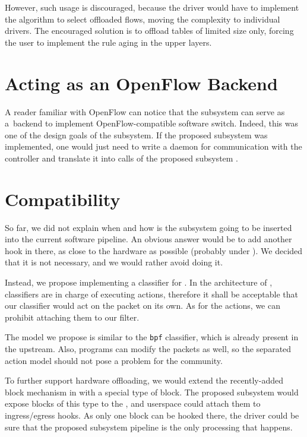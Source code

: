 However, such usage is discouraged, because the driver would have to
implement the algorithm to select offloaded flows, moving the complexity to
individual drivers. The encouraged solution is to offload tables of limited
size only, forcing the user to implement the rule aging in the upper layers.

\section{Acting as an OpenFlow Backend}

A reader familiar with OpenFlow can notice that the subsystem can serve as
a~backend to implement OpenFlow-compatible software switch. Indeed, this was
one of the design goals of the subsystem. If the proposed subsystem was
implemented, one would just need to write a daemon for communication with the
 controller and translate it into calls of the proposed subsystem
.

\section{Compatibility}
\label{rfc:tc}

So far, we did not explain when and how is the subsystem going to be inserted
into the current software pipeline. An obvious answer would be to add another
hook in there, as close to the hardware as possible (probably under ). We
decided that it is not necessary, and we would rather avoid doing it.

Instead, we propose implementing a classifier for . In the architecture
of , classifiers are in charge of executing actions, therefore it shall
be acceptable that our classifier would act on the packet on its own. As for
the  actions, we can prohibit attaching them to our filter.

The model we propose is similar to the \texttt{bpf}  classifier, which is already present
in the upstream. Also,  programs can modify the packets as well, so the
separated action model should not pose a problem for the community.

To further support hardware offloading, we would extend the recently-added
block mechanism in  with a special type of block. The proposed subsystem
would expose blocks of this type to the , and userspace could attach them
to  ingress/egress hooks. As only one block can be hooked there, the
driver could be sure that the proposed subsystem pipeline is the only
processing that happens.

